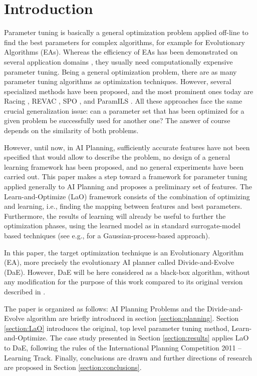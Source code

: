 \documentclass[runningheads,a4paper]{llncs}
\begin{document}
\section{Introduction}

Parameter tuning is basically a general optimization problem applied off-line to find the best parameters for complex algorithms, for example for Evolutionary Algorithms (EAs). Whereas the efficiency of EAs has been demonstrated on several application domains \cite{practice08,ParameterSettingBook07}, they usually need computationally expensive parameter tuning. Being a general optimization problem, there are as many parameter tuning algorithms as optimization techniques. However, several specialized methods have been proposed, and the most prominent ones today are Racing \cite{birattari2002}, REVAC \cite{Nannen07}, SPO \cite{SPO:CEC05}, and ParamILS \cite{ParamILS-JAIR}. All these approaches face the same crucial generalization issue: can a parameter set that has been optimized for a given problem be successfully used for another one? The answer of course depends on the similarity of both problems.

However, until now, in AI Planning, sufficiently accurate features have not been specified that would allow to describe the problem, no design of a general learning framework has been proposed, and no general experiments have been carried out. This paper makes a step toward a framework for parameter tuning applied generally to AI Planning and proposes a preliminary set of features. The Learn-and-Optimize (LaO) framework consists of the combination of optimizing and learning, i.e., finding the mapping between features and best parameters. Furthermore, the results of learning will already be useful to further the optimization phases, using the learned model as in standard surrogate-model based techniques (see e.g., \cite{Bardenet} for a Gaussian-process-based approach).

In this paper, the target optimization technique is an Evolutionary Algorithm (EA), more precisely the evolutionary AI planner called Divide-and-Evolve (DaE). However, DaE will be here considered as a black-box algorithm, without any modification for the purpose of this work compared to its original version described in \cite{BibEvoCop:2010}. 

The paper is organized as follows: AI Planning Problems and the Divide-and-Evolve algorithm are briefly introduced in section \ref{section:planning}. Section \ref{section:LaO} introduces the original, top level parameter tuning method, Learn-and-Optimize. The case study presented in Section \ref{section:results} applies LaO to DaE, following the rules of the International Planning Competition 2011 -- Learning Track. Finally, conclusions are drawn and further directions of research are proposed in Section \ref{section:conclusions}. 
\end{document}
